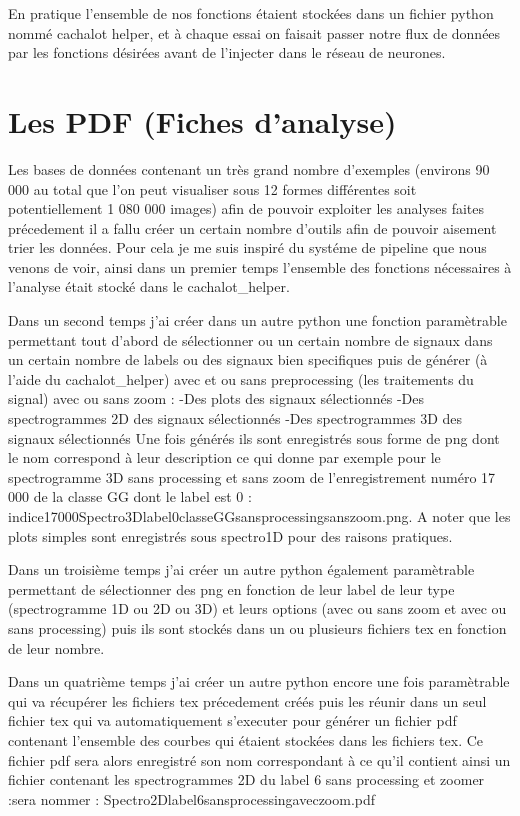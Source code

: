 En pratique l'ensemble de nos fonctions étaient stockées dans un fichier python nommé cachalot helper, et à chaque essai on faisait passer notre flux de données par les fonctions désirées avant de l'injecter dans le réseau de neurones.


\hypertarget{Les-PDF}{%
\section{Les PDF (Fiches d'analyse)}
\label{Les-PDF}}

Les bases de données contenant un très grand nombre d'exemples (environs 90 000 au total que l'on peut visualiser sous 12 formes différentes soit potentiellement 1 080 000 images) afin de pouvoir exploiter les analyses faites précedement il a fallu créer un certain nombre d'outils afin de pouvoir aisement trier les données.
Pour cela je me suis inspiré du systéme de pipeline que nous venons de voir, ainsi dans un premier temps l'ensemble des fonctions nécessaires à l'analyse était stocké dans le cachalot_helper.

Dans un second temps j'ai créer dans un autre python une fonction paramètrable permettant tout d'abord de sélectionner ou un certain nombre de signaux dans un certain nombre de labels ou des signaux bien specifiques puis de générer (à l'aide du cachalot_helper) avec et ou sans preprocessing (les traitements du signal) avec ou sans zoom :
-Des plots des signaux sélectionnés
-Des spectrogrammes 2D des signaux sélectionnés
-Des spectrogrammes 3D des signaux sélectionnés
Une fois générés ils sont enregistrés sous forme de png dont le nom correspond à leur description ce qui donne par exemple pour le spectrogramme 3D sans processing et sans zoom de l'enregistrement numéro 17 000 de la classe GG dont le label est 0 :
indice17000Spectro3Dlabel0classeGGsansprocessingsanszoom.png. A noter que les plots simples sont enregistrés sous spectro1D pour des raisons pratiques.

Dans un troisième temps j'ai créer un autre python également paramètrable permettant de sélectionner des png en fonction de leur label de leur type (spectrogramme 1D ou 2D ou 3D) et leurs options (avec ou sans zoom et avec ou sans processing) puis ils sont stockés dans un ou plusieurs fichiers tex en fonction de leur nombre.

Dans un quatrième temps j'ai créer un autre python encore une fois paramètrable qui va récupérer les fichiers tex précedement créés puis les réunir dans un seul fichier tex qui va automatiquement s'executer pour générer un fichier pdf contenant l'ensemble des courbes qui étaient stockées dans les fichiers tex. Ce fichier pdf sera alors enregistré son nom correspondant à ce qu'il contient ainsi un fichier contenant les spectrogrammes 2D du label 6 sans processing et zoomer :sera nommer : Spectro2Dlabel6sansprocessingaveczoom.pdf

